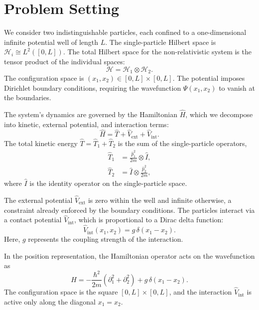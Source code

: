 \section{Problem Setting} \label{sec:problem}

We consider two indistinguishable particles, each confined to a
one-dimensional infinite potential well of length $L$.
The single-particle Hilbert space is $\mathcal{H}_i \cong L^2([0, L])$.
The total Hilbert space for the non-relativistic system is the tensor
product of the individual spaces:
\begin{equation}
	\mathcal{H} = \mathcal{H}_1 \otimes \mathcal{H}_2.
\end{equation}
The configuration space is $(x_1, x_2) \in [0, L] \times [0, L]$.
The potential imposes Dirichlet boundary conditions,
requiring the wavefunction $\Psi(x_1, x_2)$ to vanish at the boundaries.

The system's dynamics are governed by the Hamiltonian $\hat{H}$,
which we decompose into kinetic, external potential, and interaction terms:
\begin{equation}
	\hat{H} = \hat{T} + \hat{V}_{\text{ext}} + \hat{V}_{\text{int}}.
\end{equation}
The total kinetic energy $\hat{T} = \hat{T}_1 + \hat{T}_2$ is the sum
of the single-particle operators,
\begin{align}
	\hat{T}_1 &= \frac{\hat{p}_1^2}{2m} \otimes \hat{I}, \\
	\hat{T}_2 &= \hat{I} \otimes \frac{\hat{p}_2^2}{2m},
\end{align}
where $\hat{I}$ is the identity operator on the single-particle space.

The external potential $\hat{V}_{\text{ext}}$ is zero within the well and
infinite otherwise, a constraint already enforced by the boundary
conditions. The particles interact via a contact potential
$\hat{V}_{\text{int}}$, which is proportional to a Dirac delta function:
\begin{equation}
	\hat{V}_{\text{int}}(x_1, x_2) = g\,\delta(x_1 - x_2).
\end{equation}
Here, $g$ represents the coupling strength of the interaction.

In the position representation, the Hamiltonian operator acts on
the wavefunction as
\begin{equation} \label{eq:hamiltonian}
	\hat{H} = -\frac{\hbar^2}{2m}\left(\partial_{1}^2 +
	\partial_{2}^2\right) + g\,\delta(x_1 - x_2).
\end{equation}
The configuration space is the square $[0, L] \times [0, L]$,
and the interaction $\hat{V}_{\text{int}}$ is active only along
the diagonal $x_1 = x_2$.

